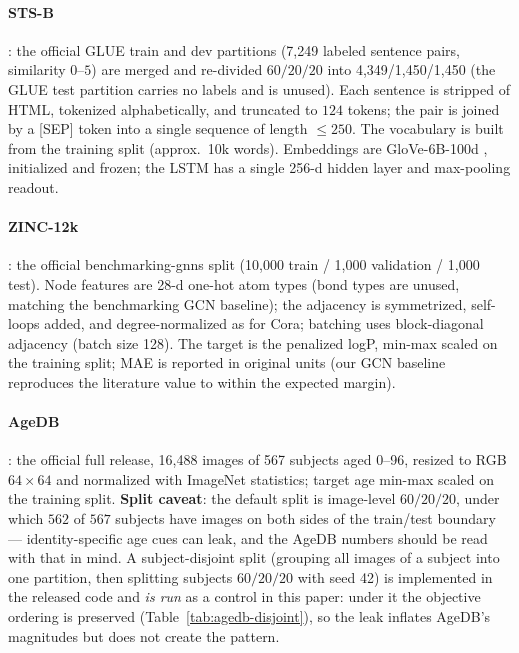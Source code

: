 \documentclass{article} %
\begin{document}
\paragraph{STS-B} \citep{cer2017semeval,wang2019glue}: the official GLUE train and dev
partitions (7{,}249 labeled sentence pairs, similarity $0$--$5$) are merged and
re-divided $60/20/20$ into 4{,}349/1{,}450/1{,}450 (the GLUE test partition carries no
labels and is unused). Each sentence is stripped of HTML, tokenized alphabetically, and
truncated to $124$ tokens; the pair is joined by a [SEP] token into a single sequence of
length $\le 250$. The vocabulary is built from the training split (approx.\ 10k words).
Embeddings are GloVe-6B-100d \citep{pennington2014glove}, initialized and frozen;
the LSTM has a single 256-d hidden layer and max-pooling readout.

\paragraph{ZINC-12k} \citep{dwivedi2023benchmarking}: the official
benchmarking-gnns split (10{,}000 train / 1{,}000 validation / 1{,}000 test). Node
features are 28-d one-hot atom types (bond types are unused, matching the benchmarking
GCN baseline); the adjacency is symmetrized, self-loops added, and degree-normalized as
for Cora; batching uses block-diagonal adjacency (batch size 128). The target is the
penalized logP, min-max scaled on the training split; MAE is reported in original units
(our GCN baseline reproduces the literature value to within the expected margin).

\paragraph{AgeDB} \citep{moschoglou2017agedb}: the official full release, 16{,}488
images of 567 subjects aged 0--96, resized to RGB $64\times64$ and normalized with
ImageNet statistics; target age min-max scaled on the training split. \textbf{Split
caveat}: the default split is image-level $60/20/20$, under which $562$ of $567$ subjects
have images on both sides of the train/test boundary --- identity-specific age cues can
leak, and the AgeDB numbers should be read with that in mind. A subject-disjoint split
(grouping all images of a subject into one partition, then splitting subjects
$60/20/20$ with seed 42) is implemented in the released code and \emph{is run} as a
control in this paper: under it the objective ordering is preserved
(Table~\ref{tab:agedb-disjoint}), so the leak inflates AgeDB's magnitudes but does not
create the pattern.
\end{document}
